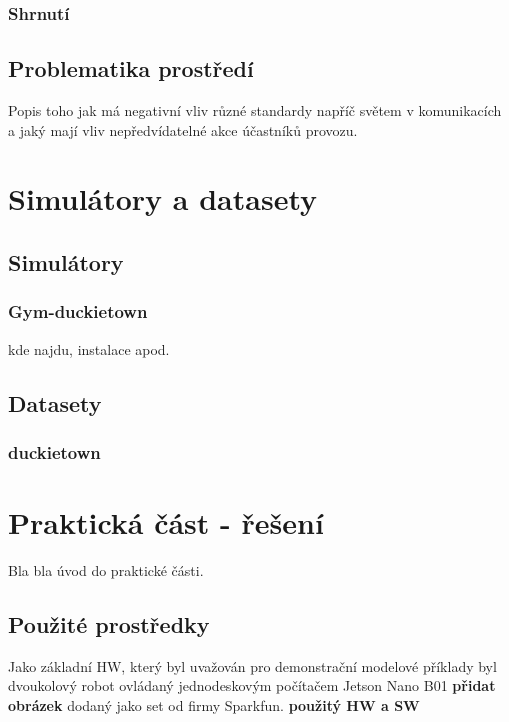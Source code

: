 \documentclass[czech, bc, kky, he, iso690alph]{fasthesis}
\begin{document}
            \subsection{Shrnutí}
            	
            
    	\section{Problematika prostředí}
    		Popis toho jak má negativní vliv různé standardy napříč světem v komunikacích a jaký mají vliv nepředvídatelné akce účastníků provozu.
    \chapter{Simulátory a datasety}
    	\section{Simulátory}
    		\subsection{Gym-duckietown}
    			kde najdu, instalace apod.
    	\section{Datasety}
    		\subsection{duckietown}
    \chapter{Praktická část - řešení}
        Bla bla úvod do praktické části.
        \section{Použité prostředky}
            Jako základní HW, který byl uvažován pro demonstrační modelové příklady byl dvoukolový robot ovládaný jednodeskovým počítačem Jetson Nano B01 \textbf{přidat obrázek} dodaný jako set od firmy Sparkfun.
            \textbf{použitý HW a SW}
\end{document}
